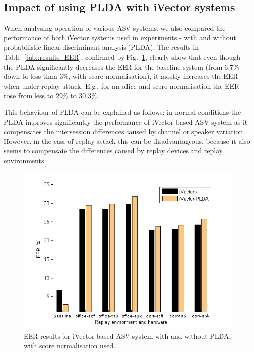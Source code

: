 \subsection{Impact of using PLDA with iVector systems}

When analysing operation of various ASV systems, we also compared the performance of both iVector systems used in experiments - with and without probabilistic linear discriminant analysis (PLDA). The results in Table~\ref{tab::results_EER}, confirmed by Fig.~\ref{fig::EER_PLDA}, clearly show that even though the PLDA significantly decreases the EER for the baseline system (from 6.7\% down to less than 3\%, with score normalisation), it mostly increases the EER when under replay attack. E.g., for an office and score normalisation the EER rose from less to 29\% to 30.3\%. 


This behaviour of PLDA can be explained as follows: in normal conditions the PLDA improves significantly the performance of iVector-based ASV system as it compensates the intersession differences caused by channel or speaker variation. However, in the case of replay attack this can be disadvantageous, because it also seems to compensate the differences caused by replay devices and replay environments.

\begin{figure}
	\centering
\includegraphics[width=1\linewidth]{Figs/EER_PLDA.png}
	\caption{EER results for iVector-based ASV system with and without PLDA, with score normalisation used.}
	\label{fig::EER_PLDA}
\end{figure}


